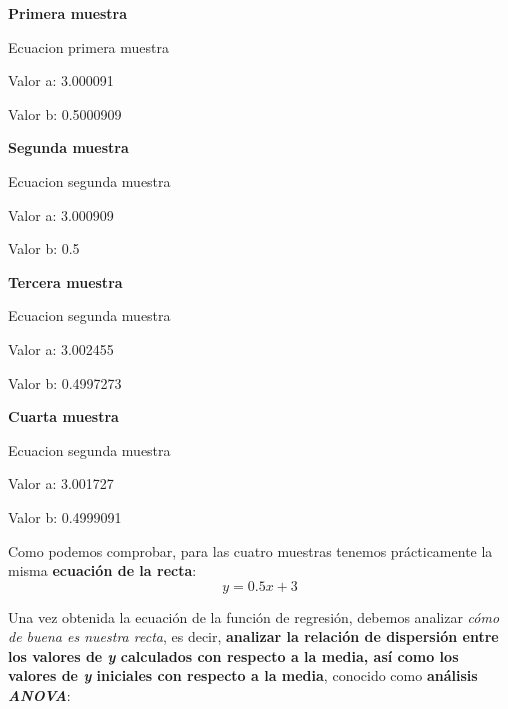 \documentclass [a4paper] {article}
\begin{document}
\textbf{Primera muestra}
\begin{Schunk}
\begin{Soutput}
Ecuacion primera muestra
\end{Soutput}
\begin{Soutput}
Valor a:  3.000091
\end{Soutput}
\begin{Soutput}
Valor b:  0.5000909
\end{Soutput}
\end{Schunk}

\textbf{Segunda muestra}
\begin{Schunk}
\begin{Soutput}
Ecuacion segunda muestra
\end{Soutput}
\begin{Soutput}
Valor a:  3.000909
\end{Soutput}
\begin{Soutput}
Valor b:  0.5
\end{Soutput}
\end{Schunk}
\newpage
\textbf{Tercera muestra}
\begin{Schunk}
\begin{Soutput}
Ecuacion segunda muestra
\end{Soutput}
\begin{Soutput}
Valor a:  3.002455
\end{Soutput}
\begin{Soutput}
Valor b:  0.4997273
\end{Soutput}
\end{Schunk}

\textbf{Cuarta muestra}
\begin{Schunk}
\begin{Soutput}
Ecuacion segunda muestra
\end{Soutput}
\begin{Soutput}
Valor a:  3.001727
\end{Soutput}
\begin{Soutput}
Valor b:  0.4999091
\end{Soutput}
\end{Schunk}

Como podemos comprobar, para las cuatro muestras tenemos prácticamente la misma \textbf{ecuación de la recta}:
\begin{equation*}
y = 0.5x + 3
\end{equation*}

Una vez obtenida la ecuación de la función de regresión, debemos analizar \textit{cómo de buena es nuestra
recta}, es decir, \textbf{analizar la relación de dispersión entre los valores de \textit{y} calculados
con respecto a la media, así como los valores de \textit{y} iniciales con respecto a la media}, conocido
como \textbf{análisis \textit{ANOVA}}:
\end{document}
